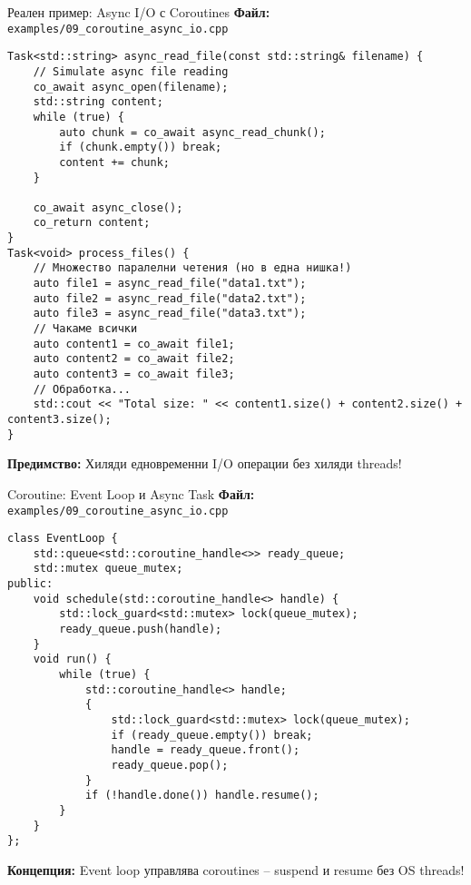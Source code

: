 \documentclass[aspectratio=169]{beamer}
\begin{document}
\begin{frame}[fragile]{Реален пример: Async I/O с Coroutines}
\textbf{Файл:} \texttt{examples/09\_coroutine\_async\_io.cpp}
\begin{lstlisting}[basicstyle=\ttfamily\tiny]
Task<std::string> async_read_file(const std::string& filename) {
    // Simulate async file reading
    co_await async_open(filename);
    std::string content;
    while (true) {
        auto chunk = co_await async_read_chunk();
        if (chunk.empty()) break;
        content += chunk;
    }
    
    co_await async_close();
    co_return content;
}
Task<void> process_files() {
    // Множество паралелни четения (но в една нишка!)
    auto file1 = async_read_file("data1.txt");
    auto file2 = async_read_file("data2.txt");
    auto file3 = async_read_file("data3.txt");
    // Чакаме всички
    auto content1 = co_await file1;
    auto content2 = co_await file2;
    auto content3 = co_await file3;
    // Обработка...
    std::cout << "Total size: " << content1.size() + content2.size() + content3.size();
}
\end{lstlisting}

\textbf{Предимство:} Хиляди едновременни I/O операции без хиляди threads!
\end{frame}

\begin{frame}[fragile]{Coroutine: Event Loop и Async Task}
\textbf{Файл:} \texttt{examples/09\_coroutine\_async\_io.cpp}
\begin{lstlisting}[basicstyle=\ttfamily\tiny]
class EventLoop {
    std::queue<std::coroutine_handle<>> ready_queue;
    std::mutex queue_mutex;
public:
    void schedule(std::coroutine_handle<> handle) {
        std::lock_guard<std::mutex> lock(queue_mutex);
        ready_queue.push(handle);
    }
    void run() {
        while (true) {
            std::coroutine_handle<> handle;
            {
                std::lock_guard<std::mutex> lock(queue_mutex);
                if (ready_queue.empty()) break;
                handle = ready_queue.front();
                ready_queue.pop();
            }
            if (!handle.done()) handle.resume();
        }
    }
};
\end{lstlisting}

\textbf{Концепция:} Event loop управлява coroutines – suspend и resume без OS threads!
\end{frame}
\end{document}
